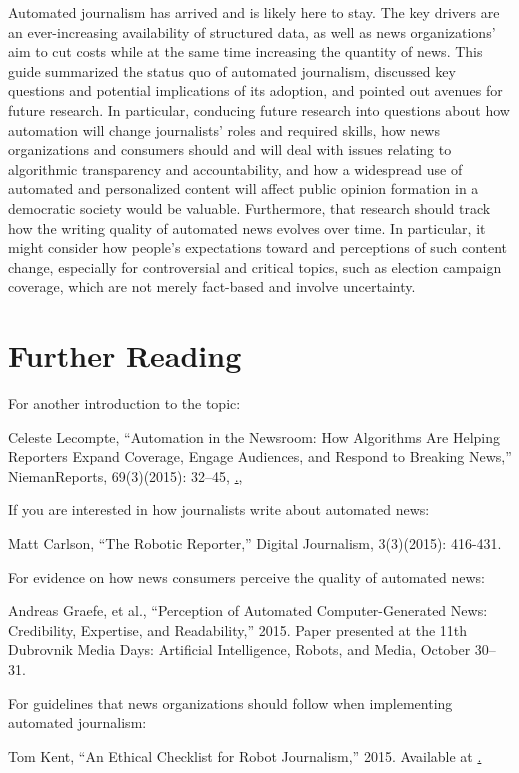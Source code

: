 \documentclass[notoc, symmetric, nobib, nols]{towcenter-book}
\begin{document}
Automated journalism has arrived and is likely here to stay. The key drivers are an ever-increasing availability of structured data, as well as news organizations’ aim to cut costs while at the same time increasing the quantity of news. This guide summarized the status quo of automated journalism, discussed key questions and potential implications of its adoption, and pointed out avenues for future research. In particular, conducing future research into questions about how automation will change journalists’ roles and required skills, how news organizations and consumers should and will deal with issues relating to algorithmic transparency and accountability, and how a widespread use of automated and personalized content will affect public opinion formation in a democratic society would be valuable. Furthermore, that research should track how the writing quality of automated news evolves over time. In particular, it might consider how people’s expectations toward and perceptions of such content change, especially for controversial and critical topics, such as election campaign coverage, which are not merely fact-based and involve uncertainty.

\chapter{Further Reading}

For another introduction to the topic:

Celeste Lecompte, ``Automation in the Newsroom: How Algorithms Are Helping Reporters Expand Coverage, Engage Audiences, and Respond to Breaking News,'' NiemanReports, 69(3)(2015): 32--45, \href{http://niemanreports.org/articles/automation-in-the-newsroom/}., 

If you are interested in how journalists write about automated news:

Matt Carlson, ``The Robotic Reporter,'' Digital Journalism, 3(3)(2015): 416-431. 

For evidence on how news consumers perceive the quality of automated news:

Andreas Graefe, et al., ``Perception of Automated Computer-Generated News: Credibility, Expertise, and Readability,'' 2015. Paper presented at the 11th Dubrovnik Media Days: Artificial Intelligence, Robots, and Media, October 30--31. 

For guidelines that news organizations should follow when implementing automated journalism:

Tom Kent, ``An Ethical Checklist for Robot Journalism,'' 2015. Available at \href{https://medium.com/@tjrkent/an-ethical-checklist-for-robot-journalism-1f41dcbd7be2}.   
\end{document}
